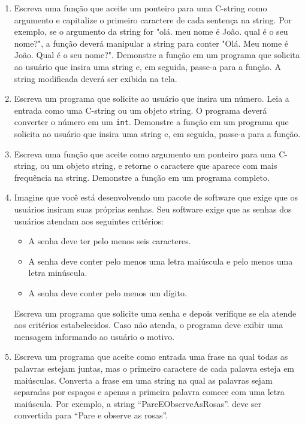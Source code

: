 \documentclass[12pt]{article}
\begin{document}
\begin{enumerate}
  \item Escreva uma função que aceite um ponteiro para uma C-string como argumento e capitalize o primeiro caractere de cada sentença na string. Por exemplo, se o argumento da string for "olá. meu nome é João. qual é o seu nome?", a função deverá manipular a string para conter "Olá. Meu nome é João. Qual é o seu nome?". Demonstre a função em um programa que solicita ao usuário que insira uma string e, em seguida, passe-a para a função. A string modificada deverá ser exibida na tela.

  \item Escreva um programa que solicite ao usuário que insira um número. Leia a entrada como uma C-string ou um objeto string. O programa deverá converter o número em um \texttt{int}. Demonstre a função em um programa que solicita ao usuário que insira uma string e, em seguida, passe-a para a função.

  \item Escreva uma função que aceite como argumento um ponteiro para uma C-string, ou um objeto string, e retorne o caractere que aparece com mais frequência na string. Demonstre a função em um programa completo.

  \item Imagine que você está desenvolvendo um pacote de software que exige que os usuários insiram suas próprias senhas. Seu software exige que as senhas dos usuários atendam aos seguintes critérios:
    \begin{itemize}
      \item A senha deve ter pelo menos seis caracteres.
      \item A senha deve conter pelo menos uma letra maiúscula e pelo menos uma letra minúscula.
      \item A senha deve conter pelo menos um dígito.
    \end{itemize}
    Escreva um programa que solicite uma senha e depois verifique se ela atende aos critérios estabelecidos. Caso não atenda, o programa deve exibir uma mensagem informando ao usuário o motivo.

  \item Escreva um programa que aceite como entrada uma frase na qual todas as palavras estejam juntas, mas o primeiro caractere de cada palavra esteja em maiúsculas. Converta a frase em uma string na qual as palavras sejam separadas por espaços e apenas a primeira palavra comece com uma letra maiúscula. Por exemplo, a string ``PareEObserveAsRosas''. deve ser convertida para ``Pare e observe as rosas''.

\end{enumerate}
\end{document}
